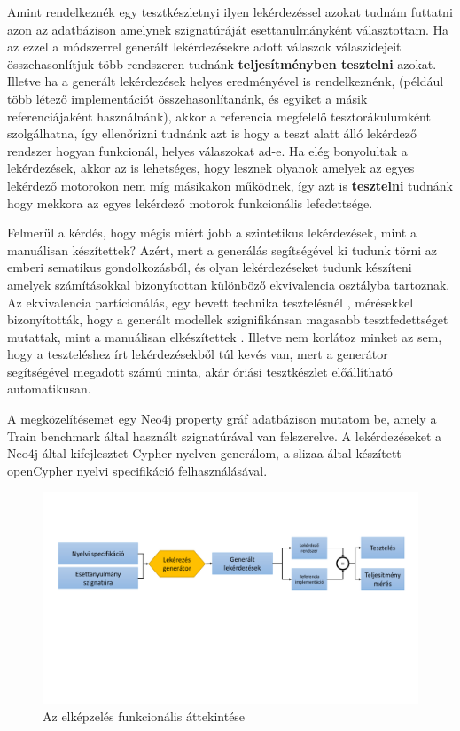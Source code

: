 Amint rendelkeznék egy tesztkészletnyi ilyen lekérdezéssel azokat tudnám futtatni azon az adatbázison amelynek szignatúráját esettanulmányként választottam. Ha az ezzel a módszerrel generált lekérdezésekre adott válaszok válaszidejeit összehasonlítjuk több rendszeren tudnánk \textbf{teljesítményben tesztelni} azokat. Illetve ha a generált lekérdezések helyes eredményével is rendelkeznénk, (például több létező implementációt összehasonlítanánk, és egyiket a másik referenciájaként használnánk), akkor a referencia  megfelelő tesztorákulumként szolgálhatna, így ellenőrizni tudnánk azt is hogy a teszt alatt álló lekérdező rendszer hogyan funkcionál, helyes válaszokat ad-e. Ha elég bonyolultak a lekérdezések, akkor az is lehetséges, hogy lesznek olyanok amelyek az egyes lekérdező motorokon nem míg másikakon működnek, így azt is \textbf{tesztelni} tudnánk hogy mekkora az egyes lekérdező motorok funkcionális lefedettsége.
    
Felmerül a kérdés, hogy mégis miért jobb a szintetikus lekérdezések, mint a manuálisan készítettek? Azért, mert a generálás segítségével ki tudunk törni az emberi sematikus gondolkozásból, és olyan lekérdezéseket tudunk készíteni amelyek számításokkal bizonyítottan különböző ekvivalencia osztályba tartoznak. Az ekvivalencia partícionálás, egy bevett  technika tesztelésnél \cite{burnstein2006practical}, mérésekkel bizonyították, hogy a generált modellek szignifikánsan magasabb tesztfedettséget mutattak, mint a manuálisan elkészítettek \cite{semerath2018iterative}. Illetve nem korlátoz minket az sem, hogy a teszteléshez írt lekérdezésekből túl kevés van, mert a generátor segítségével megadott számú minta, akár óriási tesztkészlet előállítható automatikusan.

A megközelítésemet egy Neo4j \cite{neo4j} property gráf adatbázison mutatom be, amely a Train benchmark \cite{szarnyas2018train} által használt szignatúrával van felszerelve. A  lekérdezéseket a Neo4j által kifejlesztet Cypher \cite{Cypher} nyelven generálom, a slizaa \cite{slizaa_2018} által készített openCypher nyelvi specifikáció felhasználásával. 


\begin{figure}
	\centering
	\includegraphics[width=1.0\textwidth]{figures/funkcionalisAttekintes}
	\caption{Az elképzelés funkcionális áttekintése}
	\label{fig:funkcionalisAttekintes}
\end{figure}
 
